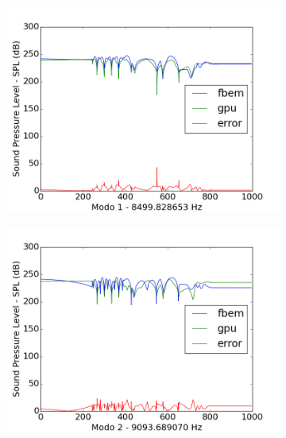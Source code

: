 \begin{figure}[ht]
\begin{subfigure}{0.45\textwidth}
	\includegraphics[width=\textwidth]{../data/transfer_test/steel_key/plots/steel_key-tfv-0_1.png}
	\caption{}
	\label{fig:coef_key_1}
\end{subfigure}
\begin{subfigure}{0.45\textwidth}
	\centering
	\includegraphics[width=\textwidth]{../data/transfer_test/steel_key/plots/steel_key-tfv-0_2.png}
	\caption{}
	\label{fig:coef_key_2}
\end{subfigure}%
\begin{subfigure}{0.45\textwidth}
	\centering

\end{subfigure}
\end{figure}
